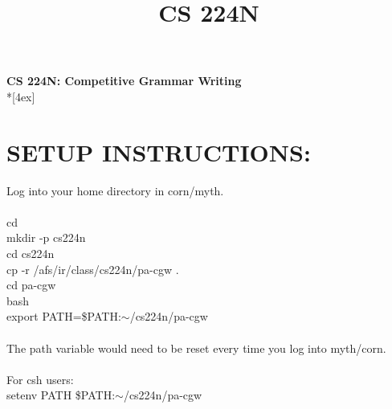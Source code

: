 \documentclass[11pt]{article}
\begin{document}
\thispagestyle{empty}
\parindent 0pt
\vfill
\large

\begin{center}
\title{CS 224N}
\LARGE{\bf {CS 224N: Competitive Grammar Writing}} \\*[4ex]
\end{center}

\section{SETUP INSTRUCTIONS:}

Log into your home directory in corn/myth. \\ \\
cd \\
mkdir -p cs224n \\
cd cs224n \\
cp -r /afs/ir/class/cs224n/pa-cgw . \\
cd pa-cgw \\
bash \\
export PATH=\$PATH:$\sim$/cs224n/pa-cgw \\
\\
The path variable would need to be reset every time you log into myth/corn. \\ 
\\
For csh users: \\
setenv PATH \${PATH}:$\sim$/cs224n/pa-cgw
\end{document}
